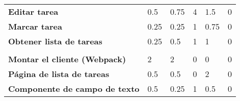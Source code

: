 \begin{table}[]
\begin{adjustbox}{width=\columnwidth,center}
\begin{tabular}{llllll}
{\color[HTML]{000000} \textbf{Editar tarea}}                           & {\color[HTML]{000000} 0.5}                      & {\color[HTML]{000000} 0.75}                     & {\color[HTML]{000000} 4}                            & {\color[HTML]{000000} 1.5}                                  & {\color[HTML]{000000} 0}                                        \\
{\color[HTML]{000000} \textbf{Marcar tarea}}                           & {\color[HTML]{000000} 0.25}                     & {\color[HTML]{000000} 0.25}                     & {\color[HTML]{000000} 1}                            & {\color[HTML]{000000} 0.75}                                 & {\color[HTML]{000000} 0}                                        \\
{\color[HTML]{000000} \textbf{Obtener lista de tareas}}                & {\color[HTML]{000000} 0.25}                     & {\color[HTML]{000000} 0.5}                      & {\color[HTML]{000000} 1}                            & {\color[HTML]{000000} 1}                                    & {\color[HTML]{000000} 0}                                        \\
{\color[HTML]{000000} }                                                & {\color[HTML]{000000} }                         & {\color[HTML]{000000} }                         & {\color[HTML]{000000} }                             & {\color[HTML]{000000} }                                     & {\color[HTML]{000000} }                                         \\
{\color[HTML]{000000} \textbf{Montar el cliente (Webpack)}}            & {\color[HTML]{000000} 2}                        & {\color[HTML]{000000} 2}                        & {\color[HTML]{000000} 0}                            & {\color[HTML]{000000} 0}                                    & {\color[HTML]{000000} 0}                                        \\
{\color[HTML]{000000} \textbf{Página de lista de tareas}}              & {\color[HTML]{000000} 0.5}                      & {\color[HTML]{000000} 0.5}                      & {\color[HTML]{000000} 0}                            & {\color[HTML]{000000} 2}                                    & {\color[HTML]{000000} 0}                                        \\
{\color[HTML]{000000} \textbf{Componente de campo de texto}}           & {\color[HTML]{000000} 0.5}                      & {\color[HTML]{000000} 0.25}                     & {\color[HTML]{000000} 1}                            & {\color[HTML]{000000} 0.5}                                  & {\color[HTML]{000000} 0}                                        \\

\end{tabular}
\end{adjustbox}
\end{table}

